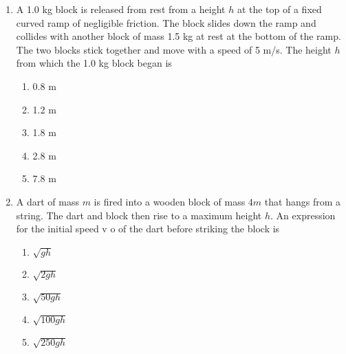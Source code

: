 \documentclass{../../../oss-apphys}
\begin{document}
\begin{multicols}{2}
\begin{enumerate}[resume,leftmargin=18pt]
    
  \item A 1.0 kg block is released from rest from a height $h$ at the top of a
    fixed curved ramp of negligible friction. The block slides down the
    ramp and collides with another block of mass 1.5 kg at rest at the
    bottom of the ramp. The two blocks stick together and move with a
    speed of 5 m/s. The height $h$ from which the 1.0 kg block began is
    \begin{enumerate}[noitemsep,topsep=0pt,leftmargin=18pt,label=(\Alph*)]
    \item 0.8 m
    \item 1.2 m
    \item 1.8 m
    \item 2.8 m
    \item 7.8 m
    \end{enumerate}

  \item A dart of mass $m$ is fired into a wooden block of mass $4m$ that hangs
    from a string. The dart and block then rise to a maximum height $h$. An
    expression for the initial speed v o of the dart before striking the block
    is
    \begin{enumerate}[noitemsep,topsep=0pt,leftmargin=18pt,label=(\Alph*)]
    \item$\sqrt{gh}$
    \item$\sqrt{2gh}$
    \item$\sqrt{50gh}$
    \item$\sqrt{100gh}$
    \item$\sqrt{250gh}$
    \end{enumerate}


\end{enumerate}
\end{multicols}
\end{document}
